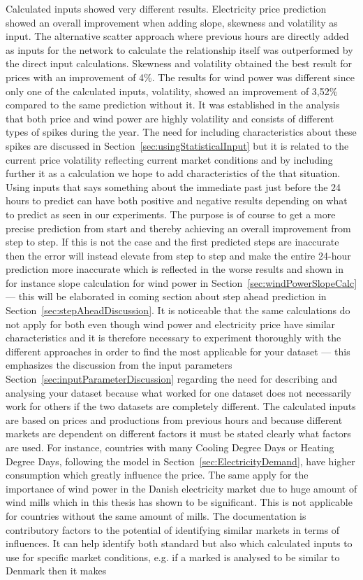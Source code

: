 Calculated inputs showed very different results. Electricity price prediction showed an overall improvement when adding slope, skewness and volatility as input. The alternative scatter approach where previous hours are directly added as inputs for the network to calculate the relationship itself was outperformed by the direct input calculations. Skewness and volatility obtained the best result for prices with an improvement of 4\%. The results for wind power was different since only one of the calculated inputs, volatility, showed an improvement of 3,52\% compared to the same prediction without it. It was established in the analysis that both price and wind power are highly volatility and consists of different types of spikes during the year. The need for including characteristics about these spikes are discussed in Section~\ref{sec:usingStatisticalInput} but it is related to the current price volatility reflecting current market conditions\cite{yamin2004adaptive} and by including further it as a calculation we hope to add characteristics of the that situation. Using inputs that says something about the immediate past just before the 24 hours to predict can have both positive and negative results depending on what to predict as seen in our experiments. The purpose is of course to get a more precise prediction from start and thereby achieving an overall improvement from step to step. If this is not the case and the first predicted steps are inaccurate then the error will instead elevate from step to step and make the entire 24-hour prediction more inaccurate which is reflected in the worse results and shown in for instance slope calculation for wind power in Section~\ref{sec:windPowerSlopeCalc} --- this will be elaborated in coming section about step ahead prediction in Section~\ref{sec:stepAheadDiscussion}. It is noticeable that the same calculations do not apply for both even though wind power and electricity price have similar characteristics and it is therefore necessary to experiment thoroughly with the different approaches in order to find the most applicable for your dataset --- this emphasizes the discussion from the input parameters Section~\ref{sec:inputParameterDiscussion} regarding the need for describing and analysing your dataset because what worked for one dataset does not necessarily work for others if the two datasets are completely different. The calculated inputs are based on prices and productions from previous hours and because different markets are dependent on different factors  it must be stated clearly what factors are used. For instance, countries with many Cooling Degree Days or Heating Degree Days, following the model in Section~\ref{sec:ElectricityDemand}, have higher consumption which greatly influence the price. The same apply for the importance of wind power in the Danish electricity market due to huge amount of wind mills which in this thesis has shown to be significant. This is not applicable for countries without the same amount of mills. The documentation is contributory factors to the potential of identifying similar markets in terms of influences. It can help identify both standard but also which calculated inputs to use for specific market conditions, e.g. if a marked is analysed to be similar to Denmark then it makes 
